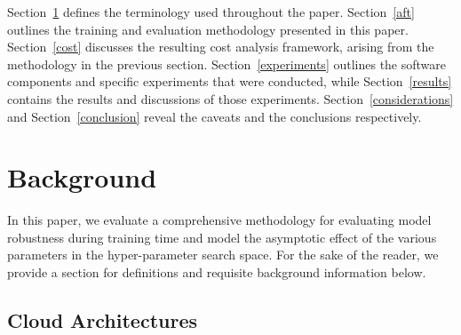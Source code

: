 \documentclass[sn-mathphys-num]{sn-jnl}%
\begin{document}
Section~\ref{background} defines the terminology used throughout the paper. Section~\ref{aft} outlines the training and evaluation methodology presented in this paper. Section~\ref{cost} discusses the resulting cost analysis framework, arising from the methodology in the previous section. Section~\ref{experiments} outlines the software components and specific experiments that were conducted, while Section~\ref{results} contains the results and discussions of those experiments. Section~\ref{considerations} and Section~\ref{conclusion} reveal the caveats and the conclusions respectively.


\section{Background}
\label{background}



In this paper, we evaluate a comprehensive methodology for evaluating model robustness during training time and model the asymptotic effect of the various parameters in the hyper-parameter search space. For the sake of the reader, we provide a section for definitions and requisite background information below.


\subsection{Cloud Architectures}
\end{document}
